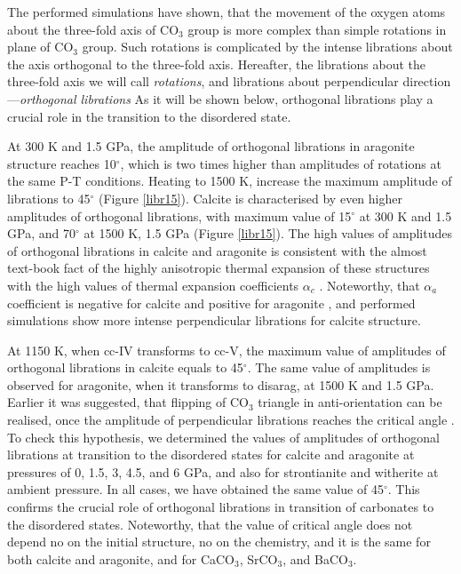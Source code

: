\documentclass[journal=jacsat,manuscript=article]{achemso}
\begin{document}
The performed simulations have shown, that the movement of the oxygen atoms about the three-fold axis of CO$_3$ group is more complex than simple rotations in plane of CO$_3$ group. 
Such rotations is complicated by the intense librations about the axis orthogonal to the three-fold axis.
Hereafter, the librations about the three-fold axis we will call {\it rotations}, and librations about perpendicular direction---{\it orthogonal librations}
As it will be shown below, orthogonal librations play a crucial role in the transition to the disordered state.

At 300 K and 1.5 GPa, the amplitude of orthogonal librations in aragonite structure reaches 10$^{\circ}$, which is two times higher than amplitudes of rotations at the same P-T conditions.
Heating to 1500 K, increase the maximum amplitude of librations to 45$^{\circ}$ (Figure \ref{libr15}). 
Calcite is characterised by even higher amplitudes of orthogonal librations, with maximum value of 15$^{\circ}$ at 300 K and 1.5 GPa,   and 70$^{\circ}$ at  1500 K, 1.5 GPa (Figure \ref{libr15}).  
The high values of amplitudes of orthogonal librations in calcite and aragonite is consistent with the almost text-book fact of the highly anisotropic thermal expansion of these structures with the high values of thermal expansion coefficients $\alpha_c$  \cite{markgraf1985}.
Noteworthy, that $\alpha_a$ coefficient is negative for calcite \cite{markgraf1985} and positive for aragonite \cite{antao2009, ye2012}, and performed simulations show more intense perpendicular librations for calcite structure.

At 1150 K, when cc-IV transforms to cc-V, the maximum value of amplitudes of orthogonal librations in calcite equals to 45$^{\circ}$. 
The same value of amplitudes is observed for aragonite, when it transforms to disarag, at 1500 K and 1.5 GPa. 
Earlier it was suggested, that flipping of CO$_3$ triangle in anti-orientation can be realised, once the amplitude of perpendicular librations reaches the critical angle \cite{dove2005}.
To check this hypothesis, we determined the values of amplitudes of orthogonal librations at transition to the disordered states for calcite and aragonite at pressures of 0, 1.5, 3, 4.5, and 6 GPa, and also for strontianite and witherite at ambient pressure.
In all cases, we have obtained the same value of 45$^{\circ}$.
This confirms the crucial role of orthogonal librations in transition of carbonates to the disordered states.
Noteworthy, that the value of critical angle does not depend no on the initial structure, no on the chemistry, and it is the same for both calcite and aragonite, and for CaCO$_3$, SrCO$_3$, and BaCO$_3$.
\end{document}
